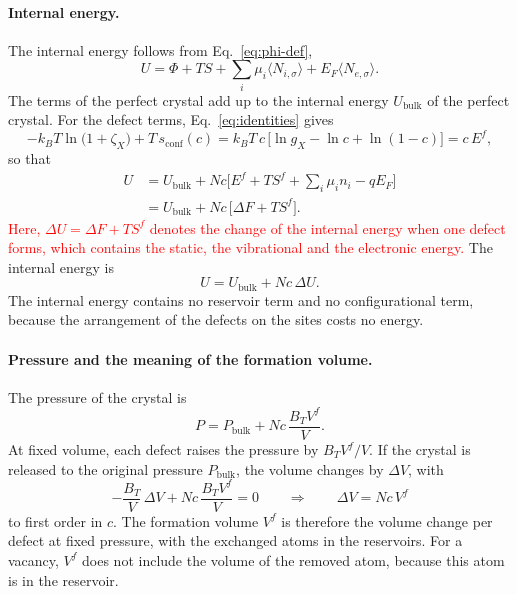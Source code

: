 \documentclass[11pt]{article}      %
\numberwithin{equation}{section}   %
\begin{document}
\paragraph{Internal energy.}
The internal energy follows from Eq.~\eqref{eq:phi-def},
\begin{equation*}
    U=\Phi+TS+\sum_i\mu_i\langle N_{i,\sigma}\rangle
    +E_F\langle N_{e,\sigma}\rangle.
\end{equation*}
The terms of the perfect crystal add up to the internal energy
$U_{\text{bulk}}$ of the perfect crystal. For the defect terms,
Eq.~\eqref{eq:identities} gives
\begin{equation*}
    -k_BT\ln\big(1+\zeta_X\big)+T\,s_{\text{conf}}(c)
    =k_BT\,c\,\big[\ln g_X-\ln c+\ln(1-c)\big]=c\,E^f,
\end{equation*}
so that
\begin{align*}
    U&=U_{\text{bulk}}+Nc\Big[E^f+TS^f+\sum_i\mu_in_i-qE_F\Big]\\
    &=U_{\text{bulk}}+Nc\,\big[\Delta F+TS^f\big].
\end{align*}
\textcolor{red}{Here, $\Delta U=\Delta F+TS^f$ denotes the change of the
internal energy when one defect forms, which contains the static, the
vibrational and the electronic energy.} The internal energy is
\begin{equation}
    \boxed{U=U_{\text{bulk}}+Nc\,\Delta U.}
\end{equation}
The internal energy contains no reservoir term and no configurational term,
because the arrangement of the defects on the sites costs no energy.

\paragraph{Pressure and the meaning of the formation volume.}
The pressure of the crystal is
\begin{equation}
    \boxed{P=P_{\text{bulk}}+Nc\,\frac{B_TV^f}{V}.}
\end{equation}
At fixed volume, each defect raises the pressure by $B_TV^f/V$. If the
crystal is released to the original pressure $P_{\text{bulk}}$, the volume
changes by $\Delta V$, with
\begin{equation*}
    -\frac{B_T}{V}\,\Delta V+Nc\,\frac{B_TV^f}{V}=0
    \qquad\Longrightarrow\qquad
    \Delta V=Nc\,V^f
\end{equation*}
to first order in $c$. The formation volume $V^f$ is therefore the volume
change per defect at fixed pressure, with the exchanged atoms in the
reservoirs. For a vacancy, $V^f$ does not include the volume of the removed
atom, because this atom is in the reservoir.
\end{document}

